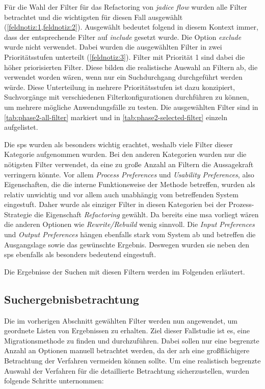 Für die Wahl der Filter für das Refactoring von \emph{jadice flow} wurden alle Filter betrachtet und die wichtigsten für diesen Fall ausgewählt (\cref{feldnotiz:1,feldnotiz:2}).
Ausgewählt bedeutet folgend in diesem Kontext immer, dass der entsprechende Filter auf \emph{include} gesetzt wurde.
Die Option \emph{exclude} wurde nicht verwendet.
Dabei wurden die ausgewählten Filter in zwei Prioritätsstufen unterteilt (\cref{feldnotiz:3}).
Filter mit Priorität 1 sind dabei die höher priorisierten Filter.
Diese bilden die realistische Auswahl an Filtern ab, die verwendet worden wären, wenn nur ein Suchdurchgang durchgeführt werden würde.
Diese Unterteilung in mehrere Prioritätsstufen ist dazu konzipiert, Suchvorgänge mit verschiedenen Filterkonfigurationen durchführen zu können, um mehrere mögliche Anwendungsfälle zu testen.
Die ausgewählten Filter sind in \cref{tab:phase2-all-filter} markiert und in \cref{tab:phase2-selected-filter} einzeln aufgelistet.



Die \glspl{sp} wurden als besonders wichtig erachtet, weshalb viele Filter dieser Kategorie aufgenommen wurden.
Bei den anderen Kategorien wurden nur die nötigsten Filter verwendet, da eine zu große Anzahl an Filtern die Aussagekraft verringern könnte.
Vor allem \emph{Process Preferences} und \emph{Usability Preferences}, also Eigenschaften, die die interne Funktionsweise der Methode betreffen, wurden als relativ unwichtig und vor allem auch unabhängig vom betreffenden System eingestuft.
Daher wurde als einziger Filter in diesen Kategorien bei der Prozess-Strategie die Eigenschaft \emph{Refactoring} gewählt.
Da bereits eine \gls{msa} vorliegt wären die anderen Optionen wie \emph{Rewrite/Rebuild} wenig sinnvoll.
Die \emph{Input Preferences} und \emph{Output Preferences} hängen ebenfalls stark vom System ab und betreffen die Ausgangslage sowie das gewünschte Ergebnis.
Deswegen wurden sie neben den \glspl{sp} ebenfalls als besonders bedeutend eingestuft. 

Die Ergebnisse der Suchen mit diesen Filtern werden im Folgenden erläutert.

\subsection{Suchergebnisbetrachtung}
\label{sec:phase2-ergebnisdurchsicht}

Die im vorherigen Abschnitt gewählten Filter werden nun angewendet, um geordnete Listen von Ergebnissen zu erhalten. 
Ziel dieser Fallstudie ist es, eine Migrationsmethode zu finden und durchzuführen. 
Dabei sollen nur eine begrenzte Anzahl an Optionen manuell betrachtet werden, da der \gls{arh} eine großflächigere Betrachtung der Verfahren vermeiden können sollte.
Um eine realistisch begrenzte Auswahl der Verfahren für die detaillierte Betrachtung sicherzustellen, wurden folgende Schritte unternommen:

